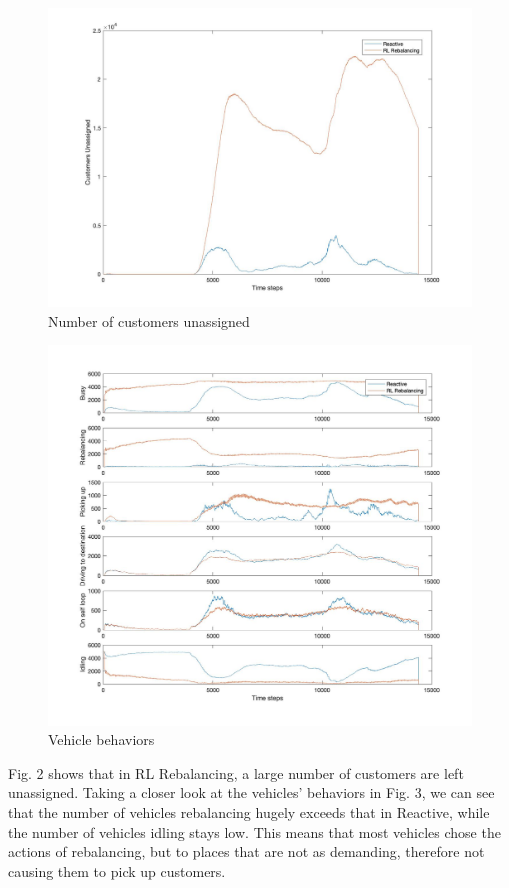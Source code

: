 \documentclass[letterpaper, 10 pt, conference]{ieeeconf}  %
\begin{document}
\begin{figure}[thpb]
      \centering
      \includegraphics[scale=0.18]{custUnassigned.jpg}
      \caption{Number of customers unassigned}
      \label{figurelabel}
\end{figure}
\begin{figure}[thpb]
      \centering
      \includegraphics[scale=0.18]{vehicles.jpg}
      \caption{Vehicle behaviors}
      \label{figurelabel}
\end{figure}

Fig. 2 shows that in RL Rebalancing, a large number of customers are left unassigned. Taking a closer look at the vehicles' behaviors in Fig. 3, we can see that the number of vehicles rebalancing hugely exceeds that in Reactive, while the number of vehicles idling stays low. This means that most vehicles chose the actions of rebalancing, but to places that are not as demanding, therefore not causing them to pick up customers. 
\end{document}
